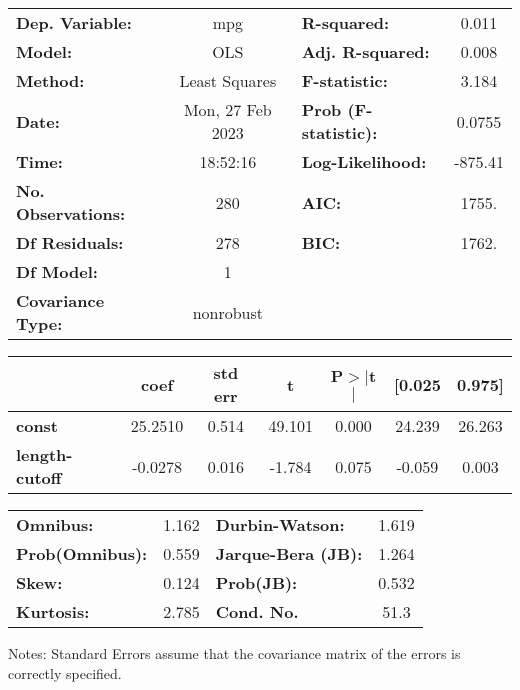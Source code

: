 \begin{center}
\begin{tabular}{lclc}
\toprule
\textbf{Dep. Variable:}    &       mpg        & \textbf{  R-squared:         } &     0.011   \\
\textbf{Model:}            &       OLS        & \textbf{  Adj. R-squared:    } &     0.008   \\
\textbf{Method:}           &  Least Squares   & \textbf{  F-statistic:       } &     3.184   \\
\textbf{Date:}             & Mon, 27 Feb 2023 & \textbf{  Prob (F-statistic):} &   0.0755    \\
\textbf{Time:}             &     18:52:16     & \textbf{  Log-Likelihood:    } &   -875.41   \\
\textbf{No. Observations:} &         280      & \textbf{  AIC:               } &     1755.   \\
\textbf{Df Residuals:}     &         278      & \textbf{  BIC:               } &     1762.   \\
\textbf{Df Model:}         &           1      & \textbf{                     } &             \\
\textbf{Covariance Type:}  &    nonrobust     & \textbf{                     } &             \\
\bottomrule
\end{tabular}
\begin{tabular}{lcccccc}
                       & \textbf{coef} & \textbf{std err} & \textbf{t} & \textbf{P$> |$t$|$} & \textbf{[0.025} & \textbf{0.975]}  \\
\midrule
\textbf{const}         &      25.2510  &        0.514     &    49.101  &         0.000        &       24.239    &       26.263     \\
\textbf{length-cutoff} &      -0.0278  &        0.016     &    -1.784  &         0.075        &       -0.059    &        0.003     \\
\bottomrule
\end{tabular}
\begin{tabular}{lclc}
\textbf{Omnibus:}       &  1.162 & \textbf{  Durbin-Watson:     } &    1.619  \\
\textbf{Prob(Omnibus):} &  0.559 & \textbf{  Jarque-Bera (JB):  } &    1.264  \\
\textbf{Skew:}          &  0.124 & \textbf{  Prob(JB):          } &    0.532  \\
\textbf{Kurtosis:}      &  2.785 & \textbf{  Cond. No.          } &     51.3  \\
\bottomrule
\end{tabular}
\end{center}

Notes: \newline
 [1] Standard Errors assume that the covariance matrix of the errors is correctly specified.